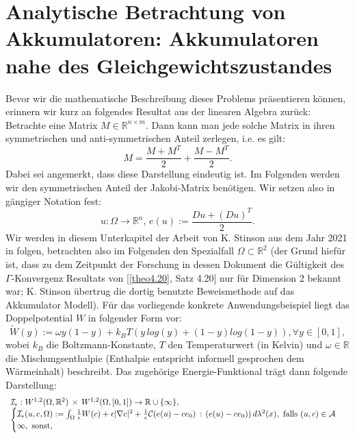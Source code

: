 \section{Analytische Betrachtung von Akkumulatoren: Akkumulatoren nahe des Gleichgewichtszustandes}{\label{sec:anabatt}}
Bevor wir die mathematische Beschreibung dieses Problems präsentieren können, erinnern wir kurz an folgendes Resultat aus der linearen Algebra zurück:\\
Betrachte eine Matrix \(M \in \mathbb{R}^{n \times m}\). Dann kann man jede solche Matrix in ihren symmetrischen und anti-symmetrischen Anteil zerlegen, i.e. es gilt:
\begin{equation}
    M = \frac{M + M^T}{2} + \frac{M - M^T}{2}.
\end{equation}
Dabei sei angemerkt, dass diese Darstellung eindeutig ist. Im Folgenden werden wir den symmetrischen Anteil der Jakobi-Matrix benötigen. Wir setzen also in gängiger Notation fest:
\begin{equation}
    u: \Omega \to \mathbb{R}^n, \, e(u):= \frac{Du + (Du)^T}{2}.
\end{equation}
Wir werden in diesem Unterkapitel der Arbeit von K. Stinson aus dem Jahr 2021 in \cite{Stinson_2021} folgen, betrachten also im Folgenden den Spezialfall \(\Omega \subset \mathbb{R}^2\) (der Grund hiefür ist, dass zu dem Zeitpunkt der Forschung in dessen Dokument die Gültigkeit des \(\Gamma\)-Konvergenz Resultats von [\ref{theo4.20}, Satz 4.20] nur für Dimension 2 bekannt war; K. Stinson übertrug die dortig benutzte Beweismethode auf das Akkumulator Modell). Für das vorliegende konkrete Anwendungsbeispiel liegt das Doppelpotential \(W\) in folgender Form vor:
\begin{equation}
    \tilde{W}(y) := \omega y(1-y) + k_B T (y \, log(y) + (1-y) log(1-y)), \forall y \in [0,1],
\end{equation}
wobei \(k_B\) die Boltzmann-Konstante, \(T\) den Temperaturwert (in Kelvin) und \(\omega \in \mathbb{R}\) die Mischungsenthalpie (Enthalpie entspricht informell gesprochen dem Wärmeinhalt) beschreibt. Das zugehörige Energie-Funktional trägt dann folgende Darstellung:
\begin{equation}{\label{eq5.4}}
\begin{array}{l}
\mathcal{I}_{\epsilon} : W^{1,2}(\Omega,\mathbb{R}^2) \, \times \, W^{1,2}(\Omega,[0,1]) \to \mathbb{R} \cup \{\infty\}, \\
    \begin{cases} \mathcal{I}_{\epsilon} (u,c,\Omega) := \int_{\Omega} \frac{1}{\epsilon} W(c) + \epsilon |\nabla c|^2 + \frac{1}{\epsilon} \mathcal{C} (e(u) - c e_0) \, : \, (e(u) - c e_0))\,d\lambda^2(x), \text{ falls }(u,c) \in \mathcal{A} \\
    \infty, \text{ sonst,}
    \end{cases}
\end{array}
\end{equation}

